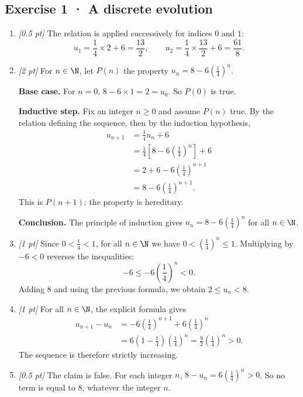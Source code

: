 \subsection*{Exercise 1 · A discrete evolution}\begin{enumerate}

\item \textit{[0.5 pt]} The relation is applied successively for indices $0$ and $1$:\[u_1=\frac{1}{4}\times 2+6=\frac{13}{2},\qquad u_2=\frac{1}{4}\times \frac{13}{2}+6=\frac{61}{8}.\]

\item \textit{[2 pt]} For $n\in\N$, let $P(n)$ the property $u_n=8-6\left(\frac{1}{4}\right)^n$.
\par\smallskip\textbf{Base case.} For $n=0$, $8-6\times1=2=u_0$. So $P(0)$ is true.
\par\smallskip\textbf{Inductive step.} Fix an integer $n\ge0$ and assume $P(n)$ true. By the relation defining the sequence, then by the induction hypothesis,
\[\begin{aligned}u_{n+1}&=\frac{1}{4}u_n+6\\
&=\frac{1}{4}\left[8-6\left(\frac{1}{4}\right)^n\right]+6\\
&=2+6-6\left(\frac{1}{4}\right)^{n+1}\\
&=8-6\left(\frac{1}{4}\right)^{n+1}.
\end{aligned}\]
This is $P(n+1)$: the property is hereditary.
\par\smallskip\textbf{Conclusion.} The principle of induction gives $u_n=8-6\left(\frac{1}{4}\right)^n$ for all $n\in\N$.

\item \textit{[1 pt]} Since $0<\frac{1}{4}<1$, for all $n\in\N$ we have $0<(\frac{1}{4})^n\le1$. Multiplying by $-6<0$ reverses the inequalities:
\[-6\le-6(\frac{1}{4})^n<0.\]
Adding $8$ and using the previous formula, we obtain $2\le u_n<8$.

\item \textit{[1 pt]} For all $n\in\N$, the explicit formula gives
\[\begin{aligned}u_{n+1}-u_n&=-6(\frac{1}{4})^{n+1}+6(\frac{1}{4})^n\\&=6(1-\frac{1}{4})(\frac{1}{4})^n=\frac{9}{2}(\frac{1}{4})^n>0.\end{aligned}\]
The sequence is therefore strictly increasing.

\item \textit{[0.5 pt]} The claim is false. For each integer $n$, $8-u_n=6(\frac{1}{4})^n>0$. So no term is equal to $8$, whatever the integer $n$.

\end{enumerate}

